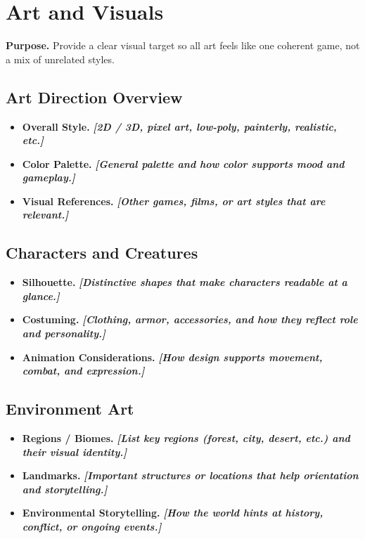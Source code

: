 \documentclass[12pt]{article}
\newcommand{\placeholder}[1]{\textbf{\textit{[#1]}}}
\begin{document}
\section{Art and Visuals}

\textbf{Purpose.} Provide a clear visual target so all art feels like one coherent game, not a mix
of unrelated styles.

\subsection{Art Direction Overview}

\begin{itemize}
    \item \textbf{Overall Style.} \placeholder{2D / 3D, pixel art, low-poly, painterly, realistic, etc.}
    \item \textbf{Color Palette.} \placeholder{General palette and how color supports mood and gameplay.}
    \item \textbf{Visual References.} \placeholder{Other games, films, or art styles that are relevant.}
\end{itemize}

\subsection{Characters and Creatures}

\begin{itemize}
    \item \textbf{Silhouette.} \placeholder{Distinctive shapes that make characters readable at a glance.}
    \item \textbf{Costuming.} \placeholder{Clothing, armor, accessories, and how they reflect role and personality.}
    \item \textbf{Animation Considerations.} \placeholder{How design supports movement, combat, and expression.}
\end{itemize}

\subsection{Environment Art}

\begin{itemize}
    \item \textbf{Regions / Biomes.} \placeholder{List key regions (forest, city, desert, etc.) and their visual identity.}
    \item \textbf{Landmarks.} \placeholder{Important structures or locations that help orientation and storytelling.}
    \item \textbf{Environmental Storytelling.} \placeholder{How the world hints at history, conflict, or ongoing events.}
\end{itemize}
\end{document}
